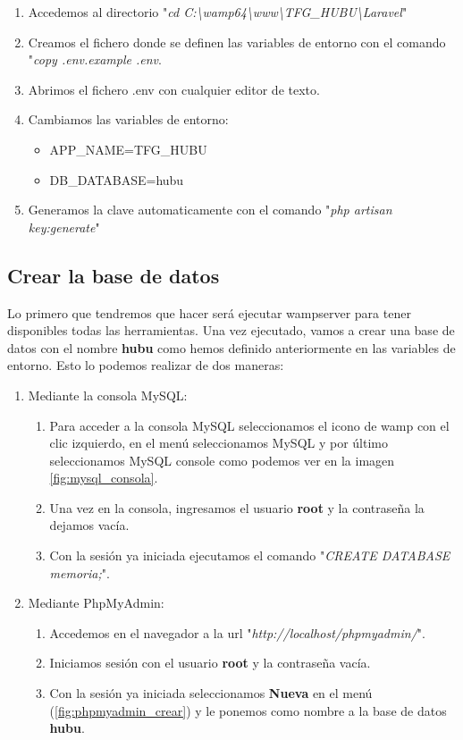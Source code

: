 \begin{enumerate}
    \item Accedemos al directorio "\textit{cd C:\textbackslash{}wamp64\textbackslash{}www\textbackslash{}TFG\_HUBU\textbackslash{}Laravel}"
    \item Creamos el fichero donde se definen las variables de entorno con el comando "\textit{copy .env.example .env}.
    \item Abrimos el fichero .env con cualquier editor de texto.
    \item Cambiamos las variables de entorno:
    \begin{itemize}
        \item APP\_NAME=TFG\_HUBU
        \item DB\_DATABASE=hubu
    \end{itemize}
    \item Generamos la clave automaticamente con el comando "\textit{php artisan key:generate}"
\end{enumerate}

\subsection{Crear la base de datos}

Lo primero que tendremos que hacer será ejecutar wampserver para tener disponibles todas las herramientas. Una vez ejecutado, vamos a crear una base de datos con el nombre \textbf{hubu} como hemos definido anteriormente en las variables de entorno. Esto lo podemos realizar de dos maneras:

\begin{enumerate}
    \item Mediante la consola MySQL:
    \begin{enumerate}
        \item Para acceder a la consola MySQL seleccionamos el icono de wamp con el clic izquierdo, en el menú seleccionamos MySQL y por último seleccionamos MySQL console como podemos ver en la imagen \ref{fig:mysql_consola}.
        \item Una vez en la consola, ingresamos el usuario \textbf{root} y la contraseña la dejamos vacía.
        \item Con la sesión ya iniciada ejecutamos el comando "\textit{CREATE DATABASE memoria;}".
    \end{enumerate}
    \item Mediante PhpMyAdmin:
    \begin{enumerate}
        \item Accedemos en el navegador a la url "\textit{http://localhost/phpmyadmin/}".
        \item Iniciamos sesión con el usuario \textbf{root} y la contraseña vacía.
        \item Con la sesión ya iniciada seleccionamos \textbf{Nueva} en el menú (\ref{fig:phpmyadmin_crear}) y le ponemos como nombre a la base de datos \textbf{hubu}.
    \end{enumerate}
\end{enumerate}


